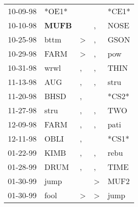\begin{supertabular}{p{0.07\textwidth}p{0.06\textwidth}p{0.02\textwidth}p{0.02\textwidth}p{0.06\textwidth}}
          10-09-98\textsuperscript{} &                            *OE1* &                  &                  &                            *CE1* \\
          10-10-98\textsuperscript{} &  \textbf{MUFB\textsuperscript{}} &                  &                , &           NOSE\textsuperscript{} \\
          10-25-98\textsuperscript{} &           bttm\textsuperscript{} &     \textgreater &                , &           GSON\textsuperscript{} \\
          10-29-98\textsuperscript{} &           FARM\textsuperscript{} &     \textgreater &                , &            pow\textsuperscript{} \\
          10-31-98\textsuperscript{} &           wrwl\textsuperscript{} &                , &                , &           THIN\textsuperscript{} \\
          11-13-98\textsuperscript{} &            AUG\textsuperscript{} &                , &                , &           stru\textsuperscript{} \\
          11-20-98\textsuperscript{} &           BHSD\textsuperscript{} &                , &                  &                            *CS2* \\
          11-27-98\textsuperscript{} &           stru\textsuperscript{} &                , &                , &            TWO\textsuperscript{} \\
          12-09-98\textsuperscript{} &           FARM\textsuperscript{} &                , &                , &           pati\textsuperscript{} \\
          12-11-98\textsuperscript{} &           OBLI\textsuperscript{} &                , &                  &                            *CS1* \\
          01-22-99\textsuperscript{} &           KIMB\textsuperscript{} &                , &                , &           rebu\textsuperscript{} \\
          01-28-99\textsuperscript{} &           DRUM\textsuperscript{} &                , &                , &           TIME\textsuperscript{} \\
          01-30-99\textsuperscript{} &           jump\textsuperscript{} &                  &     \textgreater &           MUF2\textsuperscript{} \\
          01-30-99\textsuperscript{} &           fool\textsuperscript{} &     \textgreater &     \textgreater &           jump\textsuperscript{} \\

\end{supertabular}

